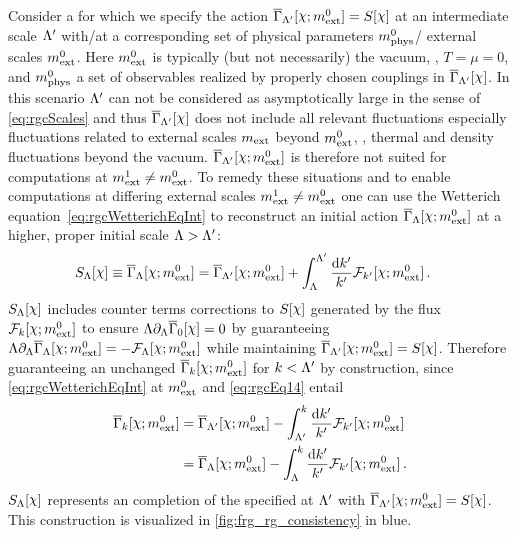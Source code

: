 Consider a \loeft{} for which we specify the action ${\FSeaa_\LambdaP[\FSsf;m_\ext^0]=S[\FSsf]}$ at an intermediate scale ${\Lambda'}$ with/at a corresponding set of physical parameters $m_{\mathrm{phys}}^0$/ external scales $m_{\mathrm{ext}}^0$.
Here $m_{\mathrm{ext}}^0$ is typically (but not necessarily) the vacuum, \eg{}, $T=\mu=0$, and  $m_{\mathrm{phys}}^0$ a set of \ir{} observables realized by properly chosen couplings in $\FSeaa_\LambdaP[\FSsf]$.
In this scenario ${\Lambda'}$ can not be considered as asymptotically large in the sense of \cref{eq:rgcScales} and thus $\FSeaa_\LambdaP[\FSsf]$ does not include all relevant fluctuations especially \wrt{} fluctuations related to external scales $m_{\mathrm{ext}}$ beyond $m_{\mathrm{ext}}^0$, \eg{}, thermal and density fluctuations beyond the vacuum.
$\FSeaa_\LambdaP[\FSsf;m_\ext^0]$ is therefore not suited for computations at $m_{\mathrm{ext}}^1\neq m_{\mathrm{ext}}^0$.
To remedy these situations and to enable \rgct{} computations at differing external scales $m_{\mathrm{ext}}^1\neq m_{\mathrm{ext}}^0$ one can use the Wetterich equation~\eqref{eq:rgcWetterichEqInt} to reconstruct an \uv{} initial action $\FSeaa_\Lambda[\FSsf;m_\ext^0]$ at a higher, proper \uv{} initial scale $\Lambda>{\Lambda'}$:
\begin{align}
	S_\Lambda[\FSsf]\equiv\FSeaa_\Lambda[\FSsf;m_\ext^0]&= \FSeaa_\LambdaP[\FSsf;m_\ext^0] +\int_\Lambda^\LambdaP \frac{\dif k'}{k'} \FRGflow_{k'}[\FSsf;m_\ext^0]\,.
	\label{eq:rgcEq14}
\end{align}
$S_\Lambda[\FSsf]$ includes \rgscaledependent{} counter terms \dash{} corrections to $S[\FSsf]$ \dash{} generated by the \frg{} flux $\FRGflow_{k}[\FSsf;m_\ext^0]$ to ensure \rgcy{} $\Lambda\partial_\Lambda\FSeaa_0[\FSsf]=0$ by guaranteeing $\Lambda\partial_\Lambda \FSeaa_\Lambda[\FSsf;m_\ext^0] = -\FRGflow_{\Lambda}[\FSsf;m_\ext^0]$ while maintaining $\FSeaa_\LambdaP[\FSsf;m_\ext^0]=S[\FSsf]$. 
Therefore guaranteeing an unchanged $\FSeaa_k[\FSsf;m_\ext^0]$ for $k<{\Lambda'}$ by construction, since \cref{eq:rgcWetterichEqInt} at $m_{\mathrm{ext}}^0$ and \cref{eq:rgcEq14} entail
\begin{subequations}\label{eq:rgcEq15}
\begin{align}
	\FSeaa_k[\FSsf;m_\ext^0]&= \FSeaa_\LambdaP[\FSsf;m_\ext^0] -\int_\LambdaP^k \frac{\dif k'}{k'} \FRGflow_{k'}[\FSsf;m_\ext^0]\label{eq:rgcEq15a}\\
	&=\FSeaa_\Lambda[\FSsf;m_\ext^0] -\int_\Lambda^k \frac{\dif k'}{k'} \FRGflow_{k'}[\FSsf;m_\ext^0]\label{eq:rgcEq15n}\, .
\end{align}
\end{subequations}
$S_\Lambda[\FSsf]$ represents an \uv{} completion of the \loeft{} specified at ${\Lambda'}$ with ${\FSeaa_\LambdaP[\FSsf;m_\ext^0]=S[\FSsf]}$.
This construction is visualized in \cref{fig:frg_rg_consistency} in blue.

